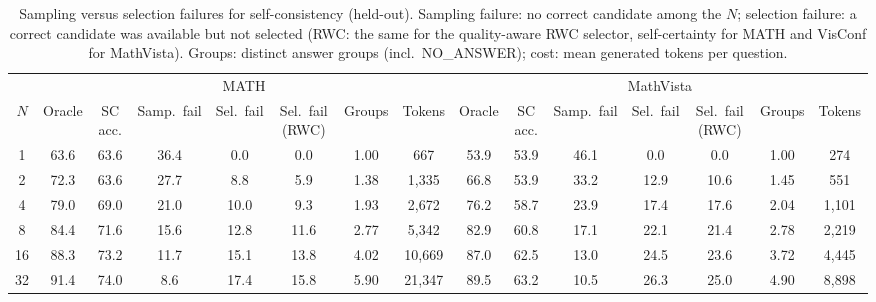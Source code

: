 \begin{table}[htbp]
\centering
\footnotesize
\caption{Sampling versus selection failures for self-consistency (held-out). Sampling failure: no correct candidate among the $N$; selection failure: a correct candidate was available but not selected (RWC: the same for the quality-aware RWC selector, self-certainty for MATH and VisConf for MathVista). Groups: distinct answer groups (incl.\ NO\_ANSWER); cost: mean generated tokens per question.}
\label{tab:t3-decomp}
\begin{adjustbox}{max width=\linewidth}
\begin{tabular}{ccccccccccccccc}
\toprule
 & \multicolumn{7}{c}{MATH} & \multicolumn{7}{c}{MathVista} \\
\cmidrule(lr){2-8}\cmidrule(lr){9-15}
$N$ & Oracle & SC acc. & Samp.\ fail & Sel.\ fail & Sel.\ fail (RWC) & Groups & Tokens & Oracle & SC acc. & Samp.\ fail & Sel.\ fail & Sel.\ fail (RWC) & Groups & Tokens \\
\midrule
1 & 63.6 & 63.6 & 36.4 & 0.0 & 0.0 & 1.00 & 667 & 53.9 & 53.9 & 46.1 & 0.0 & 0.0 & 1.00 & 274 \\
2 & 72.3 & 63.6 & 27.7 & 8.8 & 5.9 & 1.38 & 1{,}335 & 66.8 & 53.9 & 33.2 & 12.9 & 10.6 & 1.45 & 551 \\
4 & 79.0 & 69.0 & 21.0 & 10.0 & 9.3 & 1.93 & 2{,}672 & 76.2 & 58.7 & 23.9 & 17.4 & 17.6 & 2.04 & 1{,}101 \\
8 & 84.4 & 71.6 & 15.6 & 12.8 & 11.6 & 2.77 & 5{,}342 & 82.9 & 60.8 & 17.1 & 22.1 & 21.4 & 2.78 & 2{,}219 \\
16 & 88.3 & 73.2 & 11.7 & 15.1 & 13.8 & 4.02 & 10{,}669 & 87.0 & 62.5 & 13.0 & 24.5 & 23.6 & 3.72 & 4{,}445 \\
32 & 91.4 & 74.0 & 8.6 & 17.4 & 15.8 & 5.90 & 21{,}347 & 89.5 & 63.2 & 10.5 & 26.3 & 25.0 & 4.90 & 8{,}898 \\
\bottomrule
\end{tabular}
\end{adjustbox}
\end{table}

